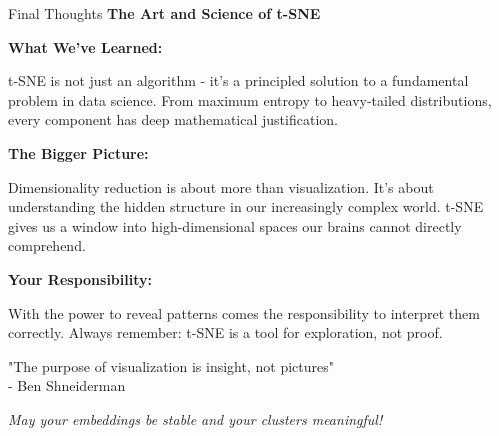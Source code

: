 \documentclass[10pt]{beamer}
\newcommand{\emphtext}[1]{\textcolor{upcblue}{\textbf{#1}}}
\newcommand{\conceptbox}[1]{\colorbox{upcblue!10}{\begin{minipage}{0.85\textwidth}\centering #1\end{minipage}}}
\begin{document}
\begin{frame}{Final Thoughts}
\emphtext{The Art and Science of t-SNE}

\vspace{0.3cm}
\textbf{What We've Learned:}

t-SNE is not just an algorithm - it's a principled solution to a fundamental problem in data science. From maximum entropy to heavy-tailed distributions, every component has deep mathematical justification.

\vspace{0.3cm}
\textbf{The Bigger Picture:}

Dimensionality reduction is about more than visualization. It's about understanding the hidden structure in our increasingly complex world. t-SNE gives us a window into high-dimensional spaces our brains cannot directly comprehend.

\vspace{0.3cm}
\textbf{Your Responsibility:}

With the power to reveal patterns comes the responsibility to interpret them correctly. Always remember: t-SNE is a tool for exploration, not proof.

\vspace{0.3cm}
\begin{center}
\conceptbox{
\footnotesize
"The purpose of visualization is insight, not pictures"\\
- Ben Shneiderman
}
\end{center}

\vspace{0.2cm}

\textit{May your embeddings be stable and your clusters meaningful!}
\end{frame}
\end{document}
